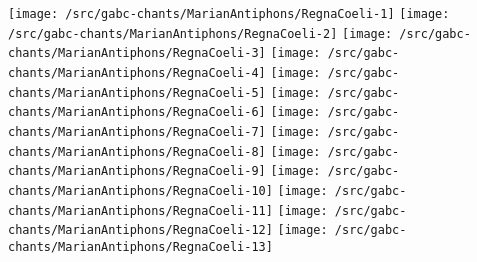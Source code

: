 \texttt{[image: /src/gabc-chants/MarianAntiphons/RegnaCoeli-1]}%
\ifx\betweenLilyPondSystem \undefined
  \linebreak
\else
  \expandafter{}%
\fi
\texttt{[image: /src/gabc-chants/MarianAntiphons/RegnaCoeli-2]}%
\ifx\betweenLilyPondSystem \undefined
  \linebreak
\else
  \expandafter{}%
\fi
\texttt{[image: /src/gabc-chants/MarianAntiphons/RegnaCoeli-3]}%
\ifx\betweenLilyPondSystem \undefined
  \linebreak
\else
  \expandafter{}%
\fi
\texttt{[image: /src/gabc-chants/MarianAntiphons/RegnaCoeli-4]}%
\ifx\betweenLilyPondSystem \undefined
  \linebreak
\else
  \expandafter{}%
\fi
\texttt{[image: /src/gabc-chants/MarianAntiphons/RegnaCoeli-5]}%
\ifx\betweenLilyPondSystem \undefined
  \linebreak
\else
  \expandafter{}%
\fi
\texttt{[image: /src/gabc-chants/MarianAntiphons/RegnaCoeli-6]}%
\ifx\betweenLilyPondSystem \undefined
  \linebreak
\else
  \expandafter{}%
\fi
\texttt{[image: /src/gabc-chants/MarianAntiphons/RegnaCoeli-7]}%
\ifx\betweenLilyPondSystem \undefined
  \linebreak
\else
  \expandafter{}%
\fi
\texttt{[image: /src/gabc-chants/MarianAntiphons/RegnaCoeli-8]}%
\ifx\betweenLilyPondSystem \undefined
  \linebreak
\else
  \expandafter{}%
\fi
\texttt{[image: /src/gabc-chants/MarianAntiphons/RegnaCoeli-9]}%
\ifx\betweenLilyPondSystem \undefined
  \linebreak
\else
  \expandafter{}%
\fi
\texttt{[image: /src/gabc-chants/MarianAntiphons/RegnaCoeli-10]}%
\ifx\betweenLilyPondSystem \undefined
  \linebreak
\else
  \expandafter{}%
\fi
\texttt{[image: /src/gabc-chants/MarianAntiphons/RegnaCoeli-11]}%
\ifx\betweenLilyPondSystem \undefined
  \linebreak
\else
  \expandafter{}%
\fi
\texttt{[image: /src/gabc-chants/MarianAntiphons/RegnaCoeli-12]}%
\ifx\betweenLilyPondSystem \undefined
  \linebreak
\else
  \expandafter{}%
\fi
\texttt{[image: /src/gabc-chants/MarianAntiphons/RegnaCoeli-13]}%
